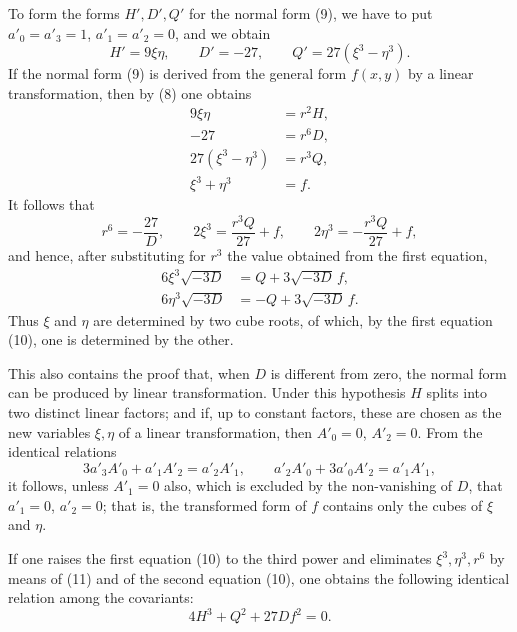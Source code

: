 \documentclass[11pt]{article}
\begin{document}
To form the forms $H',D',Q'$ for the normal form (9), we have to put $a'_0=a'_3=1$, $a'_1=a'_2=0$, and we obtain
\[
 H'=9\xi\eta,
 \qquad D'=-27,
 \qquad Q'=27(\xi^3-\eta^3).
\]
If the normal form (9) is derived from the general form $f(x,y)$ by a linear transformation, then by (8) one obtains
\begin{equation}
\begin{aligned}
 9\xi\eta&=r^2H,\\
 -27&=r^6D,\\
 27(\xi^3-\eta^3)&=r^3Q,\\
 \xi^3+\eta^3&=f.
\end{aligned}
\tag{10}
\end{equation}
It follows that
\[
 r^6=-\frac{27}{D},
 \qquad
 2\xi^3=\frac{r^3Q}{27}+f,
 \qquad
 2\eta^3=-\frac{r^3Q}{27}+f,
\]
and hence, after substituting for $r^3$ the value obtained from the first equation,
\begin{equation}
\begin{aligned}
 6\xi^3\sqrt{-3D}&=Q+3\sqrt{-3D}\,f,\\
 6\eta^3\sqrt{-3D}&=-Q+3\sqrt{-3D}\,f.
\end{aligned}
\tag{11}
\end{equation}
Thus $\xi$ and $\eta$ are determined by two cube roots, of which, by the first equation (10), one is determined by the other.

This also contains the proof that, when $D$ is different from zero, the normal form can be produced by linear transformation. Under this hypothesis $H$ splits into two distinct linear factors; and if, up to constant factors, these are chosen as the new variables $\xi,\eta$ of a linear transformation, then $A'_0=0$, $A'_2=0$. From the identical relations
\[
 3a'_3A'_0+a'_1A'_2=a'_2A'_1,
 \qquad
 a'_2A'_0+3a'_0A'_2=a'_1A'_1,
\]
it follows, unless $A'_1=0$ also, which is excluded by the non-vanishing of $D$, that $a'_1=0$, $a'_2=0$; that is, the transformed form of $f$ contains only the cubes of $\xi$ and $\eta$.

If one raises the first equation (10) to the third power and eliminates $\xi^3,\eta^3,r^6$ by means of (11) and of the second equation (10), one obtains the following identical relation among the covariants:
\begin{equation}
 4H^3+Q^2+27Df^2=0.
\tag{12}
\end{equation}
\end{document}
